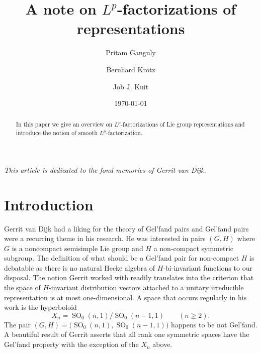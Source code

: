 \documentclass[12pt,letterpaper,titlepage,reqno]{amsart}
\theoremstyle{plain}
\theoremstyle{definition}
\numberwithin{equation}{section}
\newcommand{\SO}{\operatorname{SO}}
\begin{document}
    \title{A note on $L^p$-factorizations of representations}

	\date{\today}
	
	\begin{abstract} In this paper we give an overview on $L^p$-factorizations of Lie group representations and introduce the notion of smooth $L^p$-factorization. 		
	\end{abstract}
	\author[Ganguly]{Pritam Ganguly}
	\address{Universit\"at Paderborn, Institut f\"ur Mathematik\\Warburger Stra\ss e 100,
		33098 Paderborn}
	\author[Kr\"otz]{Bernhard Kr\"{o}tz}
	\address{Universit\"at Paderborn, Institut f\"ur Mathematik\\Warburger Stra\ss e 100,
		33098 Paderborn}
	
	\author[Kuit]{Job J. Kuit}
	\address{Universit\"at Paderborn, Institut f\"ur Mathematik\\Warburger Stra\ss e 100,
		33098 Paderborn}
	
	\maketitle

\centerline{\it This article is dedicated to the fond memories of Gerrit van Dijk.}	
	
	
	
\section{Introduction}

Gerrit van Dijk had a liking for the theory of Gel'fand pairs and Gel'fand pairs were a recurring theme in his research. He was interested in pairs $(G,H)$ where $G$ is a noncompact semisimple Lie group and $H$ a non-compact symmetric subgroup. The definition of what should be a Gel'fand pair for non-compact $H$ is debatable as there is no natural Hecke algebra of $H$-bi-invariant functions to our disposal.  The notion Gerrit worked with readily translates into the criterion that the space of $H$-invariant distribution vectors
attached to a unitary irreducible representation is at most one-dimensional.
 A space that occurs regularly in his work is the hyperboloid
$$
X_{n}
=\SO_0(n,1)/\SO_0(n-1,1)\qquad (n\geq 2).
$$
The pair $(G,H)=\big(\SO_0(n,1),\SO_0(n-1,1)\big)$ happens to be not Gel'fand.
 A beautiful result of Gerrit \cite{vanDijk} asserts that all rank one symmetric spaces have the Gel'fand property with the exception of the $X_{n}$ above.
\end{document}
